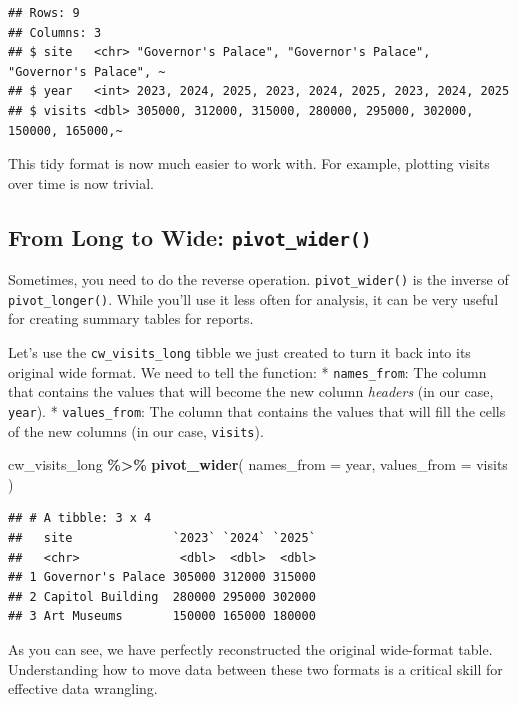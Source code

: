 \documentclass[
  11pt,
]{article}
\newenvironment{Shaded}{\begin{snugshade}}{\end{snugshade}}
\newcommand{\AttributeTok}[1]{\textcolor[rgb]{0.13,0.29,0.53}{#1}}
\newcommand{\FunctionTok}[1]{\textcolor[rgb]{0.13,0.29,0.53}{\textbf{#1}}}
\newcommand{\NormalTok}[1]{#1}
\newcommand{\SpecialCharTok}[1]{\textcolor[rgb]{0.81,0.36,0.00}{\textbf{#1}}}
\begin{document}
\begin{verbatim}
## Rows: 9
## Columns: 3
## $ site   <chr> "Governor's Palace", "Governor's Palace", "Governor's Palace", ~
## $ year   <int> 2023, 2024, 2025, 2023, 2024, 2025, 2023, 2024, 2025
## $ visits <dbl> 305000, 312000, 315000, 280000, 295000, 302000, 150000, 165000,~
\end{verbatim}

This tidy format is now much easier to work with. For example, plotting
visits over time is now trivial.

\subsection{\texorpdfstring{From Long to Wide:
\texttt{pivot\_wider()}}{From Long to Wide: pivot\_wider()}}\label{from-long-to-wide-pivot_wider}

Sometimes, you need to do the reverse operation. \texttt{pivot\_wider()}
is the inverse of \texttt{pivot\_longer()}. While you'll use it less
often for analysis, it can be very useful for creating summary tables
for reports.

Let's use the \texttt{cw\_visits\_long} tibble we just created to turn
it back into its original wide format. We need to tell the function: *
\texttt{names\_from}: The column that contains the values that will
become the new column \emph{headers} (in our case, \texttt{year}). *
\texttt{values\_from}: The column that contains the values that will
fill the cells of the new columns (in our case, \texttt{visits}).

\begin{Shaded}
\begin{Highlighting}[]
\NormalTok{cw\_visits\_long }\SpecialCharTok{\%\textgreater{}\%}
  \FunctionTok{pivot\_wider}\NormalTok{(}
    \AttributeTok{names\_from =}\NormalTok{ year,}
    \AttributeTok{values\_from =}\NormalTok{ visits}
\NormalTok{  )}
\end{Highlighting}
\end{Shaded}

\begin{verbatim}
## # A tibble: 3 x 4
##   site              `2023` `2024` `2025`
##   <chr>              <dbl>  <dbl>  <dbl>
## 1 Governor's Palace 305000 312000 315000
## 2 Capitol Building  280000 295000 302000
## 3 Art Museums       150000 165000 180000
\end{verbatim}

As you can see, we have perfectly reconstructed the original wide-format
table. Understanding how to move data between these two formats is a
critical skill for effective data wrangling.
\end{document}
